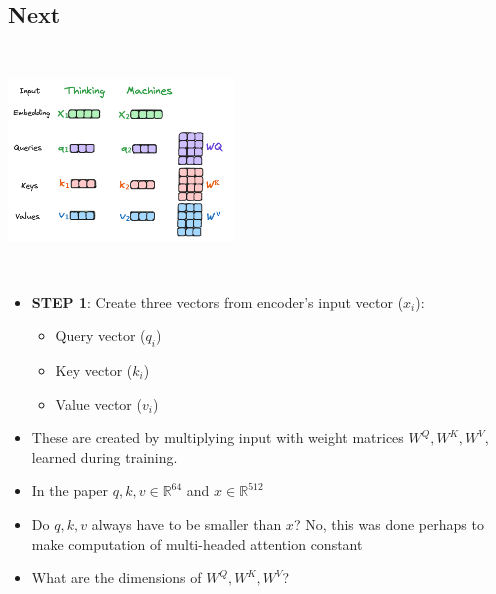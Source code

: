\documentclass{article}
\begin{document}
\subsection{Next}
\begin{minipage}{0.5\textwidth}
\includegraphics[width=6cm, height=6cm]{Transformer/Images/SelfAttention1.png}
\end{minipage}
\begin{minipage}{0.5\textwidth}
\begin{itemize}
    \item \textbf{STEP 1}: Create three vectors from encoder's input vector ($x_i$):
    \begin{itemize}
        \item Query vector ($q_i$)
        \item Key vector ($k_i$)
        \item Value vector ($v_i$)
    \end{itemize}
    \item These are created by multiplying input with weight matrices $W^Q, W^K, W^V$, learned during training.
    \item In the paper $q,k,v \in \mathbb{R}^{64} $ and $x \in \mathbb{R}^{512}$
    \item Do $q,k,v$ always have to be smaller than $x$? No, this was done perhaps to make computation of multi-headed attention constant
    \item What are the dimensions of $W^Q, W^K, W^V$?
\end{itemize}
\end{minipage}
\\
\end{document}
